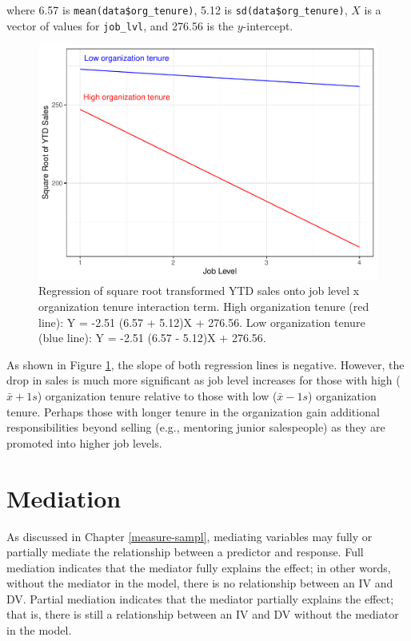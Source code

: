 \documentclass[
]{book}
\begin{document}
where 6.57 is \texttt{mean(data\$org\_tenure)}, 5.12 is \texttt{sd(data\$org\_tenure)}, \(X\) is a vector of values for \texttt{job\_lvl}, and 276.56 is the \(y\)-intercept.

\begin{figure}

{\centering \includegraphics[width=1\linewidth]{The_Fundamentals_of_People_Analytics_files/figure-latex/int-effects-1} 

}

\caption{Regression of square root transformed YTD sales onto job level x organization tenure interaction term. High organization tenure (red line): Y = -2.51 (6.57 + 5.12)X + 276.56. Low organization tenure (blue line): Y = -2.51 (6.57 - 5.12)X + 276.56.}\label{fig:int-effects}
\end{figure}

As shown in Figure \ref{fig:int-effects}, the slope of both regression lines is negative. However, the drop in sales is much more significant as job level increases for those with high (\(\bar{x} + 1s\)) organization tenure relative to those with low (\(\bar{x} - 1s\)) organization tenure. Perhaps those with longer tenure in the organization gain additional responsibilities beyond selling (e.g., mentoring junior salespeople) as they are promoted into higher job levels.

\hypertarget{mediation}{%
\section{Mediation}\label{mediation}}

As discussed in Chapter \ref{measure-sampl}, mediating variables may fully or partially mediate the relationship between a predictor and response. Full mediation indicates that the mediator fully explains the effect; in other words, without the mediator in the model, there is no relationship between an IV and DV. Partial mediation indicates that the mediator partially explains the effect; that is, there is still a relationship between an IV and DV without the mediator in the model.
\end{document}
